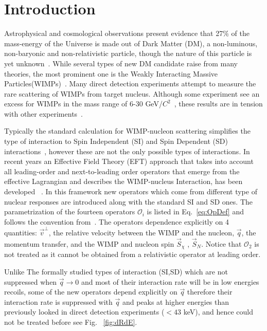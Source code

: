 \section{Introduction}

	Astrophysical and cosmological observations present evidence that 27\% of the mass-energy of the Universe is made out of Dark Matter (DM), a non-luminous, non-baryonic and non-relativistic particle, though the nature of this particle is yet unknown~\cite{Harvey1462}. While several types of new DM candidate raise from many theories, the most prominent one is the Weakly Interacting Massive Particles(WIMPs)~\cite{Bertone:2010zza}. Many  direct detection experiments attempt to measure the rare scattering of WIMPs from target nucleus. Although some experiment see an excess for WIMPs in the mass range of 6-30 GeV/$C^2$~\cite{DAMA,COGENT,CDMSlite,CREST}, these results are in tension with other experiments~\cite{xe100_run_combination,PANDAX,LUXnew}.
	
	 Typically the standard calculation for WIMP-nucleon scattering simplifies the type of interaction to Spin Independent (SI) and Spin Dependent (SD) interactions~\cite{LEWIN}, however these are not the only possible types of interactions. In recent years an Effective Field Theory (EFT) approach that takes into account all leading-order and next-to-leading order operators that emerge from the effective Lagrangian and describes the WIMP-nucleus Interaction, has been developed ~\cite{Fitzpatrick:2012ib,Anand:MathTools,Fitzpatrick:MathTools}. In this framework new operators which come from different type of nuclear responses are introduced along with the standard SI and SD ones. The parametrization of the fourteen operators $\mathcal{O}_i$ is listed in Eq.~\ref{eq:OpDef} and follows the convention from~\cite{Anand:MathTools}. The operators dependence explicitly on 4 quantities: $\vec{v}^{\perp}$, the relative velocity between the WIMP and the nucleon, $\vec{q}$, the momentum transfer, and the WIMP and nucleon spin $\vec{S}_\chi$ , $\vec{S}_N$. Notice that $\mathcal{O}_2$ is not treated as it cannot be obtained from a relativistic operator at leading order.
	 
	    Unlike The formally studied types of interaction (SI,SD) which are not suppressed when $\vec{q} \rightarrow 0$ and most of their interaction rate will be in low energies recoils, some of the new operators depend explicitly on $\vec{q}$ therefore their interaction rate is suppressed with $\vec{q}$ and peaks at higher energies than previously looked in direct detection experiments ($< 43$ keV), and hence could not be treated before see Fig. ~\ref{fig:dRdE}.
	    

